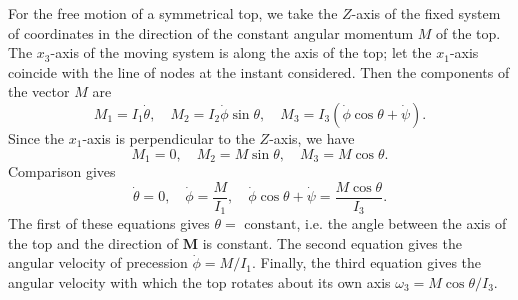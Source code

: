 For the free motion of a symmetrical top, we take the $Z$-axis of the fixed system of coordinates in the direction of the constant angular momentum $M$ of the top. The $x_3$-axis of the moving system is along the axis of the top; let the $x_1$-axis coincide with the line of nodes at the instant considered. 
Then the components of the vector $M$ are
\[M_1 = I_1\dot{\theta} ,\quad M_2 = I_2 \dot{\phi}\sin\theta ,\quad M_3 = I_3(\dot{\phi}\cos\theta + \dot{\psi}).\]
Since the $x_1$-axis is perpendicular to the $Z$-axis, we have
\[M_1 = 0 ,\quad M_2 = M\sin\theta ,\quad M_3 = M\cos\theta.\]
Comparison gives
\[\dot{\theta} = 0 ,\quad  \dot{\phi} = \frac{M}{I_1} ,\quad \dot{\phi}\cos\theta + \dot{\psi} = \frac{M\cos\theta}{I_3}.\]
The first of these equations gives $\theta = \mbox{ constant} $, i.e. the angle between the axis of the top and the direction of $\bm{M}$ is constant. The second equation gives
the angular velocity of precession $\dot{\phi} = {M}/{I_1}$. Finally, the third equation gives the angular velocity with which the top rotates about its own axis $\omega_3 = {M\cos\theta}/{I_3}$.
